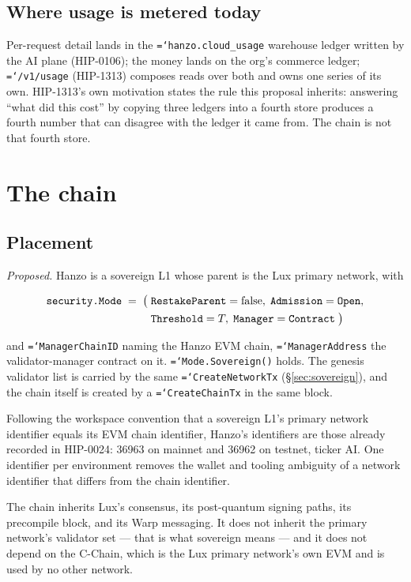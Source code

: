 \documentclass[11pt,a4paper]{article}
\newcommand{\code}[1]{\texttt{\hyphenchar\font=`\-\relax #1}}
\begin{document}
\subsection{Where usage is metered today}

Per-request detail lands in the \code{hanzo.cloud\_usage} warehouse ledger
written by the AI plane (HIP-0106); the money lands on the org's commerce
ledger; \code{/v1/usage} (HIP-1313) composes reads over both and owns one series
of its own. HIP-1313's own motivation states the rule this proposal inherits:
answering ``what did this cost'' by copying three ledgers into a fourth store
produces a fourth number that can disagree with the ledger it came from. The
chain is not that fourth store.

\section{The chain}

\subsection{Placement}

\emph{Proposed.} Hanzo is a sovereign L1 whose parent is the Lux primary
network, with

\begin{align*}
  \code{security.Mode} \;=\; \bigl(\;
    &\code{RestakeParent} = \text{false},\;
     \code{Admission} = \code{Open},\\
    &\code{Threshold} = T,\;
     \code{Manager} = \code{Contract}\;\bigr)
\end{align*}

and \code{ManagerChainID} naming the Hanzo EVM chain, \code{ManagerAddress} the
validator-manager contract on it. \code{Mode.Sovereign()} holds. The genesis
validator list is carried by the same \code{CreateNetworkTx}
(§\ref{sec:sovereign}), and the chain itself is created by a \code{CreateChainTx}
in the same block.

Following the workspace convention that a sovereign L1's primary network
identifier equals its EVM chain identifier, Hanzo's identifiers are those
already recorded in HIP-0024: 36963 on mainnet and 36962 on testnet, ticker AI.
One identifier per environment removes the wallet and tooling ambiguity of a
network identifier that differs from the chain identifier.

The chain inherits Lux's consensus, its post-quantum signing paths, its
precompile block, and its Warp messaging. It does not inherit the primary
network's validator set --- that is what sovereign means --- and it does not
depend on the C-Chain, which is the Lux primary network's own EVM and is used by
no other network.
\end{document}
